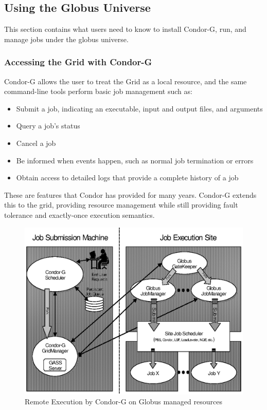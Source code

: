 \subsection{\label{sec:Using-Condor-G}Using the Globus Universe}

This section contains what users need to know to install Condor-G,
run, and manage jobs under
the globus universe.

\subsubsection{\label{sec:Grid-Access}Accessing the Grid with Condor-G}

Condor-G allows the user to treat the Grid as a local resource,
and the same command-line tools perform basic job management such as:
\begin{itemize}
\item Submit a job, indicating an executable, input and output files,
and arguments
\item Query a job's status
\item Cancel a job
\item Be informed when events happen,
such as normal job termination or errors
\item Obtain access to detailed logs that provide a complete history of a job
\end{itemize}

These are features that Condor has provided for many years.
Condor-G extends this to the grid,
providing resource management 
while still providing fault tolerance and exactly-once execution 
semantics. 

\begin{figure}[hbt]
\centering
\includegraphics{grids/gfig1.eps}
\caption{\label{fig:condorg}Remote Execution by Condor-G on Globus managed resources}
\end{figure}

